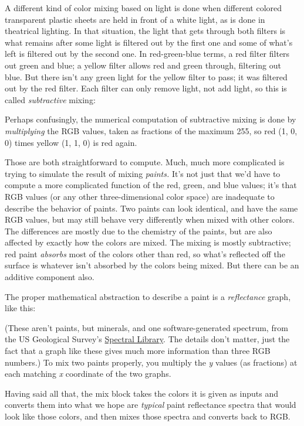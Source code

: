 A different kind of color mixing based on light is done when different
colored transparent plastic sheets are held in front of a white light,
as is done in theatrical lighting. In that situation, the light that
gets through both filters is what remains after some light is filtered
out by the first one and some of what's left is filtered out by the
second one. In red-green-blue terms, a red filter filters out green and
blue; a yellow filter allows red and green through, filtering out blue.
But there isn't any green light for the yellow filter to pass; it was
filtered out by the red filter. Each filter can only remove light, not
add light, so this is called \emph{subtractive} mixing:

Perhaps confusingly, the numerical computation of subtractive mixing is
done by \emph{multiplying} the RGB values, taken as fractions of the
maximum 255, so red (1, 0, 0) times yellow (1, 1, 0) is red again.

Those are both straightforward to compute. Much, much more complicated
is trying to simulate the result of mixing \emph{paints.} It's not just
that we'd have to compute a more complicated function of the red, green,
and blue values; it's that RGB values (or any other three-dimensional
color space) are inadequate to describe the behavior of paints. Two
paints can look identical, and have the same RGB values, but may still
behave very differently when mixed with other colors. The differences
are mostly due to the chemistry of the paints, but are also affected by
exactly how the colors are mixed. The mixing is mostly subtractive; red
paint \emph{absorbs} most of the colors other than red, so what's
reflected off the surface is whatever isn't absorbed by the colors being
mixed. But there can be an additive component also.

The proper mathematical abstraction to describe a paint is a
\emph{reflectance} graph, like this:

(These aren't paints, but minerals, and one software-generated spectrum,
from the US Geological Survey's
\href{https://www.usgs.gov/labs/spec-lab/capabilities/spectral-library}{Spectral
Library}. The details don't matter, just the fact that a graph like
these gives much more information than three RGB numbers.) To mix two
paints properly, you multiply the \emph{y} values (as fractions) at each
matching \emph{x} coordinate of the two graphs.

Having said all that, the mix block takes the colors it is given as
inputs and converts them into what we hope are \emph{typical} paint
reflectance spectra that would look like those colors, and then mixes
those spectra and converts back to RGB.

